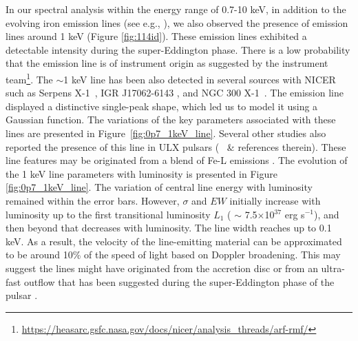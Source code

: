 \documentclass[twocolumn,trackchanges]{aastex631}
\begin{document}
In our spectral analysis within the energy range of 0.7-10 keV, in addition to the evolving iron emission lines (see e.g., \citealt{2019ApJ...885...18J}), we also observed the presence of emission lines around 1 keV (Figure \ref{fig:114id}).   These emission lines exhibited a detectable intensity during the super-Eddington phase. There is a low probability that the emission line is of instrument origin as suggested by the instrument team\footnote{\url{https://heasarc.gsfc.nasa.gov/docs/nicer/analysis_threads/arf-rmf/}}. The $\sim$1 keV line has been also detected in several sources with NICER such as  Serpens X-1~\citep{2018ApJ...858L...5L}, IGR J17062-6143 \citep{2021ApJ...912..120B}, and NGC 300 X-1~\citep{2022ApJ...940..138N}. The emission line displayed a distinctive single-peak shape, which led us to model it using a Gaussian function. The variations of the key parameters associated with these lines are presented in Figure~\ref{fig:0p7_1keV_line}.   Several other studies also reported the presence of this line in ULX pulsars ( \citealt{2023ApJ...955..124K}~\& references therein). These line features may be originated from a blend of Fe-L emissions \citep{2019A&A...627A..51G}. The evolution of the 1 keV line parameters with luminosity is presented in Figure \ref{fig:0p7_1keV_line}.  The variation of central line energy with luminosity remained within the error bars. However, $\sigma$ and $EW$  initially increase with luminosity up to the first transitional luminosity $L_{1}$ ( $\sim$ 7.5$\times$10$^{37}$ erg s$^{-1}$), and then beyond that decreases with luminosity. The line width reaches up to 0.1 keV. As a result, the velocity of the line-emitting material can be approximated to be around 10\% of the speed of light based on Doppler broadening. This may suggest the lines might have originated from the accretion disc or from an ultra-fast outflow that has been suggested during the super-Eddington phase of the pulsar  \citep{2019MNRAS.487.4355V,2019ApJ...885...18J}.


   
\end{document}
